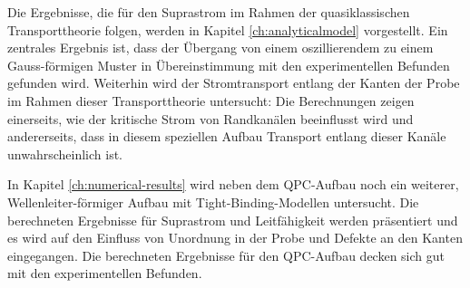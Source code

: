 Die Ergebnisse, die f\"ur den Suprastrom im Rahmen der quasiklassischen Transporttheorie folgen, werden in Kapitel  \ref{ch:analyticalmodel} vorgestellt. Ein zentrales Ergebnis ist, dass der \"Ubergang von einem oszillierendem zu einem Gauss-f\"ormigen Muster in \"Ubereinstimmung mit den experimentellen Befunden gefunden wird. Weiterhin wird der Stromtransport entlang der Kanten der Probe im Rahmen dieser Transporttheorie untersucht: Die Berechnungen zeigen einerseits, wie der kritische Strom von Randkan\"alen beeinflusst wird und andererseits, dass in diesem speziellen Aufbau Transport entlang dieser Kan\"ale unwahrscheinlich ist.

In Kapitel \ref{ch:numerical-results} wird neben dem QPC-Aufbau noch ein weiterer, Wellenleiter-f\"ormiger Aufbau mit Tight-Binding-Modellen untersucht. Die berechneten Ergebnisse f\"ur Suprastrom und Leitf\"ahigkeit werden pr\"asentiert und es wird auf den Einfluss von Unordnung in der Probe und Defekte an den Kanten eingegangen. Die berechneten Ergebnisse f\"ur den QPC-Aufbau decken sich gut mit den experimentellen Befunden.



